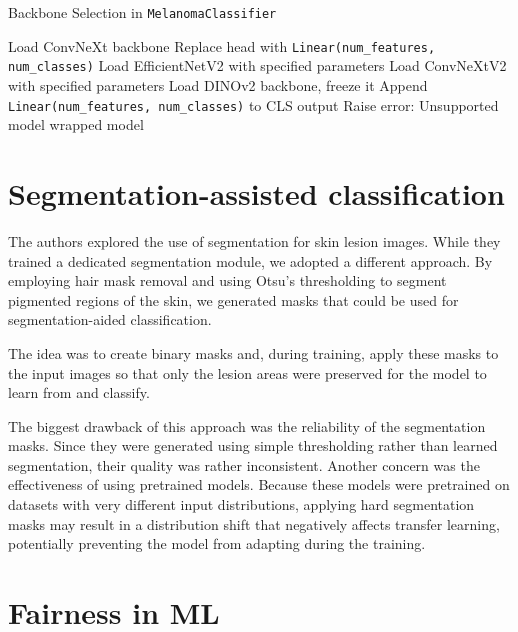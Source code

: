 \begin{algorithm}[H]
\caption{Backbone Selection in \texttt{MelanomaClassifier}}
\begin{algorithmic}[1]
        \State Load ConvNeXt backbone
        \State Replace head with \texttt{Linear(num\_features, num\_classes)}
        \State Load EfficientNetV2 with specified parameters
        \State Load ConvNeXtV2 with specified parameters
        \State Load DINOv2 backbone, freeze it
        \State Append \texttt{Linear(num\_features, num\_classes)} to CLS output
    \Else
        \State Raise error: Unsupported model
    \EndIf
    \State \Return wrapped model
\EndFunction
\end{algorithmic}
\end{algorithm}


\section{Segmentation-assisted classification}

The authors \cite{skin_color_bias_ferit} explored the use of segmentation for skin lesion images. While they trained a dedicated segmentation module, we adopted a different approach. By employing hair mask removal and using Otsu's thresholding to segment pigmented regions of the skin, we generated masks that could be used for segmentation-aided classification.

The idea was to create binary masks and, during training, apply these masks to the input images so that only the lesion areas were preserved for the model to learn from and classify.

The biggest drawback of this approach was the reliability of the segmentation masks. Since they were generated using simple thresholding rather than learned segmentation, their quality was rather inconsistent. Another concern was the effectiveness of using pretrained models. Because these models were pretrained on datasets with very different input distributions, applying hard segmentation masks may result in a distribution shift that negatively affects transfer learning, potentially preventing the model from adapting during the training.


\section{Fairness in ML}


